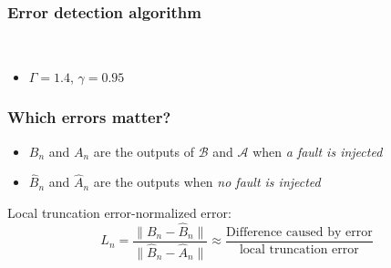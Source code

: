 \documentclass{beamer}
\newcommand{\A}{\mathcal{A}}
\newcommand{\B}{\mathcal{B}}
\begin{document}
\begin{frame}
  \frametitle{Error detection algorithm}
  

  \begin{algorithm}[H]
      \\
  \end{algorithm}
  
  \vspace{0.5cm}
  
  \begin{itemize}
    \item $\Gamma = 1.4$, $\gamma = 0.95$
  \end{itemize}
\end{frame}   


%
\begin{frame}
\frametitle{Which errors matter?}

\begin{itemize}
\item $B_n$ and $A_n$ are the outputs of $\B$ and $\A$ when \emph{a fault is injected}
\item $\hat{B}_n$ and $\hat{A}_n$ are the outputs  when \emph{no fault is injected}
\end{itemize}

\begin{center}
Local truncation error-normalized error:
\[
L_n = \frac{\| B_n - \hat{B}_n \|}{\| \hat{B}_n - \hat{A}_n \|} \approx \frac{\text{Difference caused by error}}{\text{local truncation error}}
\]
\end{center}

\end{frame}

%
%
%
%
%
%
\end{document}
